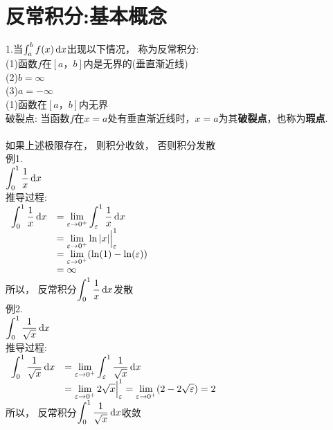 \chapter{反常积分:基本概念}
1.当$\int_a^bf(x)\mathop{}\!\mathrm{d} x$出现以下情况， 称为反常积分:\\
(1)函数$f$在$[a，b]$内是无界的(垂直渐近线)\\
(2)$b=\infty$\\
(3)$a=-\infty$\\[2ex]

(1)函数在$[a，b]$内无界\\
破裂点: 当函数$f$在$x=a$处有垂直渐近线时，$x=a$为其\textbf{破裂点}，也称为\textbf{瑕点}.\\[2ex]
\\
如果上述极限存在， 则积分收敛， 否则积分发散\\
例1.\\
$\displaystyle\int_0^1\frac{1}{x}\mathop{}\!\mathrm{d} x$\\
推导过程:\\
$\begin{array}{>{\displaystyle}r >{\displaystyle}l}
\int_0^1\frac{1}{x}\dif x & =\lim_{\varepsilon\to 0^+}\int_{\varepsilon}^1\frac{1}{x}\dif x\\
& =\lim_{\varepsilon\to 0^+}\ln|x|\Big|_{\varepsilon}^1\\
& =\lim_{\varepsilon\to 0^+}(\ln(1)-\ln(\varepsilon))\\
& =\infty
\end{array}$\\
所以， 反常积分$\displaystyle\int_0^1\frac{1}{x}\mathop{}\!\mathrm{d} x$发散\\[2ex]

例2.\\
$\displaystyle\int_0^1\frac{1}{\sqrt{x}}\mathop{}\!\mathrm{d} x$\\
推导过程:\\
$\begin{array}{>{\displaystyle}r >{\displaystyle}l}
\int_0^1\frac{1}{\sqrt{x}}\dif x & =\lim_{\varepsilon\to 0^+}\int_{\varepsilon}^1\frac{1}{\sqrt{x}}\dif x\\
& =\lim_{\varepsilon\to 0^+}2\sqrt{x}\Big|_{\varepsilon}^1=\lim_{\varepsilon\to 0^+}(2-2\sqrt{\varepsilon})=2
\end{array}$\\
所以， 反常积分$\displaystyle\int_0^1\frac{1}{\sqrt{x}}\mathop{}\!\mathrm{d} x$收敛\\

